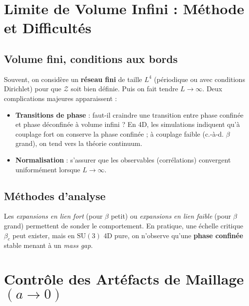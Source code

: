 \vspace{1em}

\section{Limite de Volume Infini : Méthode et Difficultés}
\label{sec:4.5}

\subsection*{Volume fini, conditions aux bords}
Souvent, on considère un \textbf{réseau fini} de taille \(L^4\) (périodique ou avec conditions Dirichlet) pour que \(\mathcal{Z}\) soit bien définie. Puis on fait tendre \(L\to\infty\). Deux complications majeures apparaissent :
\begin{itemize}
	\item \textbf{Transitions de phase} : faut-il craindre une transition entre phase confinée et phase déconfinée à volume infini ? En 4D, les simulations indiquent qu’à couplage fort on conserve la phase confinée ; à couplage faible (c.-à-d. \(\beta\) grand), on tend vers la théorie continuum.
	\item \textbf{Normalisation} : s’assurer que les observables (corrélations) convergent uniformément lorsque \(L\to \infty\).
\end{itemize}

\subsection*{Méthodes d’analyse}
Les \emph{expansions en lien fort} (pour \(\beta\) petit) ou \emph{expansions en lien faible} (pour \(\beta\) grand) permettent de sonder le comportement. En pratique, une échelle critique \(\beta_c\) peut exister, mais en \(\mathrm{SU}(3)\) 4D pure, on n’observe qu’une \textbf{phase confinée} stable menant à un \emph{mass gap}.

\vspace{1em}

\section{Contrôle des Artéfacts de Maillage \texorpdfstring{\((a \to 0)\)}{(a -> 0)}}
\label{sec:4.6}

